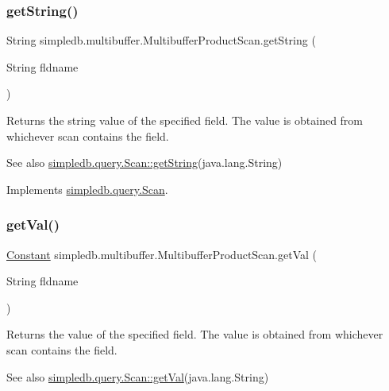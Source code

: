 \subsubsection{\texorpdfstring{get\+String()}{getString()}}
{\footnotesize\ttfamily String simpledb.\+multibuffer.\+Multibuffer\+Product\+Scan.\+get\+String (\begin{DoxyParamCaption}\item[{String}]{fldname }\end{DoxyParamCaption})\hspace{0.3cm}{\ttfamily [inline]}}

Returns the string value of the specified field. The value is obtained from whichever scan contains the field. \begin{DoxySeeAlso}{See also}
\hyperlink{interfacesimpledb_1_1query_1_1Scan_a922e219fee53ecfa6163525f9e3ef222}{simpledb.\+query.\+Scan\+::get\+String}(java.\+lang.\+String) 
\end{DoxySeeAlso}


Implements \hyperlink{interfacesimpledb_1_1query_1_1Scan_a922e219fee53ecfa6163525f9e3ef222}{simpledb.\+query.\+Scan}.

\mbox{\label{classsimpledb_1_1multibuffer_1_1MultibufferProductScan_acb1cdfd6dfe1b848e423bfb4b513b48f}} 
\subsubsection{\texorpdfstring{get\+Val()}{getVal()}}
{\footnotesize\ttfamily \hyperlink{classsimpledb_1_1query_1_1Constant}{Constant} simpledb.\+multibuffer.\+Multibuffer\+Product\+Scan.\+get\+Val (\begin{DoxyParamCaption}\item[{String}]{fldname }\end{DoxyParamCaption})\hspace{0.3cm}{\ttfamily [inline]}}

Returns the value of the specified field. The value is obtained from whichever scan contains the field. \begin{DoxySeeAlso}{See also}
\hyperlink{interfacesimpledb_1_1query_1_1Scan_aca80bca2857c983a88834bf6c01ee5ca}{simpledb.\+query.\+Scan\+::get\+Val}(java.\+lang.\+String) 
\end{DoxySeeAlso}


